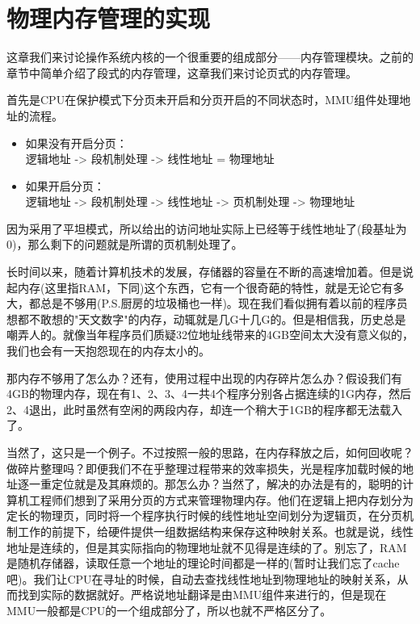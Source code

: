 
\section {物理内存管理的实现}

\par 这章我们来讨论操作系统内核的一个很重要的组成部分——内存管理模块。之前的章节中简单介绍了段式的内存管理，这章我们来讨论页式的内存管理。

\par 首先是CPU在保护模式下分页未开启和分页开启的不同状态时，MMU组件处理地址的流程。

\begin{mdframed}
	\begin{itemize}
		\item 如果没有开启分页：\\ 逻辑地址 -> 段机制处理 -> 线性地址 = 物理地址
		\item 如果开启分页：\\ 逻辑地址 -> 段机制处理 -> 线性地址 -> 页机制处理 -> 物理地址
	\end{itemize}
\end{mdframed}

\par 因为采用了平坦模式，所以给出的访问地址实际上已经等于线性地址了(段基址为0)，那么剩下的问题就是所谓的页机制处理了。

\par 长时间以来，随着计算机技术的发展，存储器的容量在不断的高速增加着。但是说起内存(这里指RAM，下同)这个东西，它有一个很奇葩的特性，就是无论它有多大，都总是不够用(P.S.厨房的垃圾桶也一样)。现在我们看似拥有着以前的程序员想都不敢想的"天文数字"的内存，动辄就是几G十几G的。但是相信我，历史总是嘲弄人的。就像当年程序员们质疑32位地址线带来的4GB空间太大没有意义似的，我们也会有一天抱怨现在的内存太小的。

\par 那内存不够用了怎么办？还有，使用过程中出现的内存碎片怎么办？假设我们有4GB的物理内存，现在有1、2、3、4一共4个程序分别各占据连续的1G内存，然后2、4退出，此时虽然有空闲的两段内存，却连一个稍大于1GB的程序都无法载入了。

\par 当然了，这只是一个例子。不过按照一般的思路，在内存释放之后，如何回收呢？做碎片整理吗？即便我们不在乎整理过程带来的效率损失，光是程序加载时候的地址逐一重定位就是及其麻烦的。那怎么办？当然了，解决的办法是有的，聪明的计算机工程师们想到了采用分页的方式来管理物理内存。他们在逻辑上把内存划分为定长的物理页，同时将一个程序执行时候的线性地址空间划分为逻辑页，在分页机制工作的前提下，给硬件提供一组数据结构来保存这种映射关系。也就是说，线性地址是连续的，但是其实际指向的物理地址就不见得是连续的了。别忘了，RAM是随机存储器，读取任意一个地址的理论时间都是一样的(暂时让我们忘了cache吧)。我们让CPU在寻址的时候，自动去查找线性地址到物理地址的映射关系，从而找到实际的数据就好。严格说地址翻译是由MMU组件来进行的，但是现在MMU一般都是CPU的一个组成部分了，所以也就不严格区分了。

